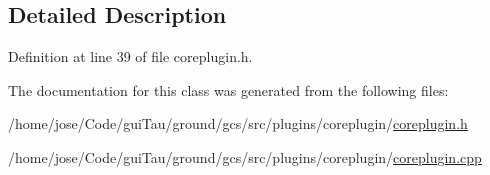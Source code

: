 \subsection{Detailed Description}


Definition at line 39 of file coreplugin.\-h.



The documentation for this class was generated from the following files\-:\begin{DoxyCompactItemize}
\item 
/home/jose/\-Code/gui\-Tau/ground/gcs/src/plugins/coreplugin/\hyperlink{coreplugin_8h}{coreplugin.\-h}\item 
/home/jose/\-Code/gui\-Tau/ground/gcs/src/plugins/coreplugin/\hyperlink{coreplugin_8cpp}{coreplugin.\-cpp}\end{DoxyCompactItemize}
